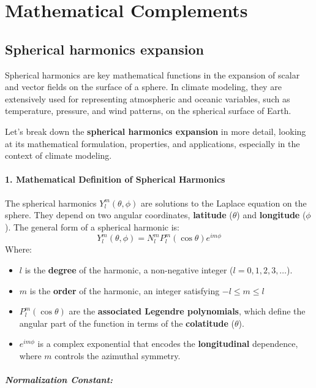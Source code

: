 \appendix

\chapter{Mathematical Complements }\label{ch:appendixA}

\section{Spherical harmonics expansion}

Spherical harmonics are key mathematical functions in the expansion of scalar and vector fields on the surface of a sphere. In climate modeling, they are extensively used for representing atmospheric and oceanic variables, such as temperature, pressure, and wind patterns, on the spherical surface of Earth.

Let's break down the \textbf{spherical harmonics expansion} in more detail, looking at its mathematical formulation, properties, and applications, especially in the context of climate modeling.

\subsubsection{1. \textbf{Mathematical Definition of Spherical Harmonics}}

The spherical harmonics $Y_l^m(\theta, \phi)$ are solutions to the Laplace equation on the sphere. They depend on two angular coordinates, \textbf{latitude} ($\theta$) and \textbf{longitude} ($\phi$).
The general form of a spherical harmonic is:
\[Y_l^m(\theta,\phi)=N_l^mP_l^m(\cos\theta)e^{im\phi}\]
Where:
\begin{itemize}
	\item $l$ is the \textbf{degree} of the harmonic, a non-negative integer ($l=0,1,2,3,…$).
	\item  $m$ is the \textbf{order} of the harmonic, an integer satisfying $-l\leq m\leq l$
	\item $P_l^m(\cos\theta)$ are the \textbf{associated Legendre polynomials}, which define the angular part of the function in terms of the \textbf{colatitude} ($\theta$).
	\item $e^{im\phi}$ is a complex exponential that encodes the \textbf{longitudinal} dependence, where $m$ controls the azimuthal symmetry.
\end{itemize}

\paragraph{\textbf{Normalization Constant}:}

